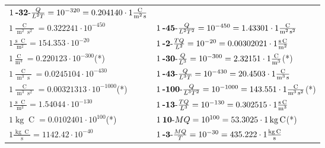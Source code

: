 \begin{center}
\begin{longtable}{l l}
	{\color{black}$1\:\text{\textbf{-32}-} \frac{Q}{L^2T}=10^{-320} = 0.204140 \cdot 1 \bm{\mathrm{ }}\frac{\operatorname{C}}{\operatorname{m}^2\operatorname{s}}$}\\
{\color{black}$1 \bm{\mathrm{ }}\frac{\operatorname{C}}{\operatorname{m}^2\operatorname{s}^2} = 0.322241\cdot10^{-450} $}&
	{\color{black}$1\:\text{\textbf{-45}-} \frac{Q}{L^2T^2}=10^{-450} = 1.43301 \cdot 1 \bm{\mathrm{ }}\frac{\operatorname{C}}{\operatorname{m}^2\operatorname{s}^2}$}\\
{\color{black}$1 \bm{\mathrm{ }}\frac{\operatorname{s}\operatorname{C}}{\operatorname{m}^2} = 154.353\cdot10^{-20} $}&
	{\color{black}$1\:\text{\textbf{-2}-} \frac{TQ}{L^2}=10^{-20} = 0.00302021 \cdot 1 \bm{\mathrm{ }}\frac{\operatorname{s}\operatorname{C}}{\operatorname{m}^2}$}\\
{\color{black}$1 \bm{\mathrm{ }}\frac{\operatorname{C}}{\operatorname{m}^3} = 0.220123\cdot10^{-300} $}\quad(*)&
	{\color{black}$1\:\text{\textbf{-30}-} \frac{Q}{L^3}=10^{-300} = 2.32151 \cdot 1 \bm{\mathrm{ }}\frac{\operatorname{C}}{\operatorname{m}^3}$}\quad(*)\\
{\color{black}$1 \bm{\mathrm{ }}\frac{\operatorname{C}}{\operatorname{m}^3\operatorname{s}} = 0.0245104\cdot10^{-430} $}&
	{\color{black}$1\:\text{\textbf{-43}-} \frac{Q}{L^3T}=10^{-430} = 20.4503 \cdot 1 \bm{\mathrm{ }}\frac{\operatorname{C}}{\operatorname{m}^3\operatorname{s}}$}\\
{\color{black}$1 \bm{\mathrm{ }}\frac{\operatorname{C}}{\operatorname{m}^3\operatorname{s}^2} = 0.00321313\cdot10^{-1000} $}\quad(*)&
	{\color{black}$1\:\text{\textbf{-100}-} \frac{Q}{L^3T^2}=10^{-1000} = 143.551 \cdot 1 \bm{\mathrm{ }}\frac{\operatorname{C}}{\operatorname{m}^3\operatorname{s}^2}$}\quad(*)\\
{\color{black}$1 \bm{\mathrm{ }}\frac{\operatorname{s}\operatorname{C}}{\operatorname{m}^3} = 1.54044\cdot10^{-130} $}&
	{\color{black}$1\:\text{\textbf{-13}-} \frac{TQ}{L^3}=10^{-130} = 0.302515 \cdot 1 \bm{\mathrm{ }}\frac{\operatorname{s}\operatorname{C}}{\operatorname{m}^3}$}\\
\hline{\color{black}$1 \bm{\mathrm{ }}\operatorname{kg}\operatorname{C} = 0.0102401\cdot10^{100} $}\quad(*)&
	{\color{black}$1\:\text{\textbf{10}-} MQ=10^{100} = 53.3025 \cdot 1 \bm{\mathrm{ }}\operatorname{kg}\operatorname{C}$}\quad(*)\\
{\color{black}$1 \bm{\mathrm{ }}\frac{\operatorname{kg}\operatorname{C}}{\operatorname{s}} = 1142.42\cdot10^{-40} $}&
	{\color{black}$1\:\text{\textbf{-3}-} \frac{MQ}{T}=10^{-30} = 435.222 \cdot 1 \bm{\mathrm{ }}\frac{\operatorname{kg}\operatorname{C}}{\operatorname{s}}$}\\

\end{longtable}
\end{center}
